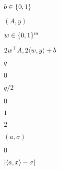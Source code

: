 \documentclass[10pt]{book}
\begin{document}
\begin{mdSnippets}
\begin{mdInlineSnippet}%
$b\in\{0,1\}$\end{mdInlineSnippet}%
\begin{mdInlineSnippet}[d336fe65a1b9e2baa5f2424b11c4cb7a]%
$(A,y)$\end{mdInlineSnippet}%
\begin{mdInlineSnippet}[095d992971d59b623b95f5dca90a9be0]%
$w\in\{0,1\}^m$\end{mdInlineSnippet}%
\begin{mdInlineSnippet}[41287cf42352e01e923978d7a7ac3fca]%
$2w^\top A, 2\langle w,y \rangle+b$\end{mdInlineSnippet}%
\begin{mdInlineSnippet}[7694f4a66316e53c8cdd9d9954bd611d]%
$q$\end{mdInlineSnippet}%
\begin{mdInlineSnippet}%
$0$\end{mdInlineSnippet}%
\begin{mdInlineSnippet}%
$q/2$\end{mdInlineSnippet}%
\begin{mdInlineSnippet}%
$0$\end{mdInlineSnippet}%
\begin{mdInlineSnippet}[c4ca4238a0b923820dcc509a6f75849b]%
$1$\end{mdInlineSnippet}%
\begin{mdInlineSnippet}[c81e728d9d4c2f636f067f89cc14862c]%
$2$\end{mdInlineSnippet}%
\begin{mdInlineSnippet}%
$(a,\sigma)$\end{mdInlineSnippet}%
\begin{mdInlineSnippet}%
$0$\end{mdInlineSnippet}%
\begin{mdInlineSnippet}[04ad110566f99888273a9196baa6135f]%
$|\langle a,x \rangle-\sigma|$\end{mdInlineSnippet}%
\begin{mdInlineSnippet}[f6e7f5f346640cf1cd084f1fb4f45491]%

\end{mdInlineSnippet}
\end{mdSnippets}
\end{document}
